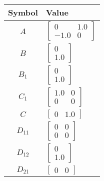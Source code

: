 \begin{tabular}{cl}
\hline
  Symbol  & Value                                                      \\
\hline
   $A$    & $\left[\begin{matrix}0 & 1.0\\-1.0 & 0\end{matrix}\right]$ \\
   $B$    & $\left[\begin{matrix}0\\1.0\end{matrix}\right]$            \\
 $B_{1}$  & $\left[\begin{matrix}0\\1.0\end{matrix}\right]$            \\
 $C_{1}$  & $\left[\begin{matrix}1.0 & 0\\0 & 0\end{matrix}\right]$    \\
   $C$    & $\left[\begin{matrix}0 & 1.0\end{matrix}\right]$           \\
 $D_{11}$ & $\left[\begin{matrix}0 & 0\\0 & 0\end{matrix}\right]$      \\
 $D_{12}$ & $\left[\begin{matrix}0\\1.0\end{matrix}\right]$            \\
 $D_{21}$ & $\left[\begin{matrix}0 & 0\end{matrix}\right]$             \\
\hline
\end{tabular}